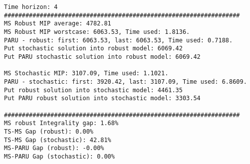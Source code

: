 \documentclass[10pt]{article}
\theoremstyle{plain}
\theoremstyle{definition}
\theoremstyle{remark}
\begin{document}
\begin{minipage}[t]{9cm}
\tiny
\begin{verbatim}
Time horizon: 4
##################################################################
MS Robust MIP average: 4782.81
MS Robust MIP worstcase: 6063.53, Time used: 1.8136.
PARU - robust: first: 6063.53, last: 6063.53, Time used: 0.7188.
Put stochastic solution into robust model: 6069.42
Put PARU stochastic solution into robust model: 6069.42

MS Stochastic MIP: 3107.09, Time used: 1.1021.
PARU - stochastic: first: 3920.42, last: 3107.09, Time used: 6.8609.
Put robust solution into stochastic model: 4461.35
Put PARU robust solution into stochastic model: 3303.54

##################################################################
MS robust Integrality gap: 1.68%
TS-MS Gap (robust): 0.00%
TS-MS Gap (stochastic): 42.81%
MS-PARU Gap (robust): -0.00%
MS-PARU Gap (stochastic): 0.00%


\end{verbatim}
\end{minipage}
\end{document}
